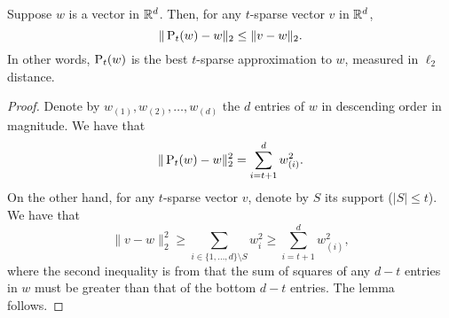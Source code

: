 
\begin{lemma}
Suppose $w$ is a vector in $\mathbb{R}^d$. Then, for any $t$-sparse vector $v$ in $\mathbb{R}^d$,
\[ \| \operatorname{P}_t(w) - w \|_2 \leq \| v - w \|_2. \]
In other words, $\operatorname{P}_t(w)$ is the best $t$-sparse approximation to $w$, measured in $\ell_2$ distance.
\label{lem:ht}
\end{lemma}
\begin{proof}
Denote by $w_{(1)}, w_{(2)}, \ldots, w_{(d)}$ the $d$ entries of $w$ in descending
order in magnitude. We have that
\[ \| \operatorname{P}_t(w) - w \|_2^2 = \sum_{i=t+1}^d w_{(i)}^2. \]
On the other hand, for any $t$-sparse vector $v$, denote by $S$ its support ($|S| \leq t$). We have that
\[ \| v - w \|_2^2 \geq \sum_{i \in \{1,\ldots,d\} \setminus S} w_i^2 \geq \sum_{i=t+1}^d w_{(i)}^2, \]
where the second inequality is from that the sum of squares of any $d-t$ entries in $w$ must be greater than that of the bottom $d-t$ entries.
The lemma follows.
\end{proof}


